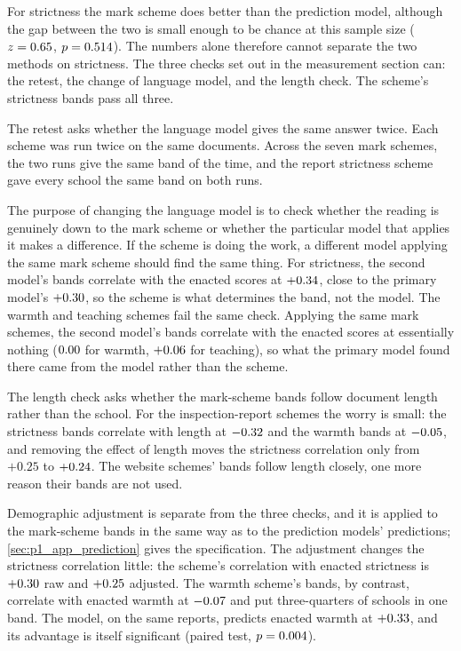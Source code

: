 For strictness the mark scheme does better than the prediction model, although the gap between the two is small enough to
be chance
at this sample size ($z = 0.65$, $p = 0.514$). The numbers alone therefore cannot
separate the two methods on strictness. The three checks set out in the measurement section
can: the retest, the change of language model, and the length check. The scheme's strictness bands pass all three.

The retest asks whether the language model gives the same answer twice. Each scheme was run
twice on the same documents. Across the seven mark schemes, the two runs give the same
band \GridRetestExact{} of the time, and the report strictness scheme gave every school
the same band on both runs.

The purpose of changing the language model is to check whether the reading is genuinely down
to the mark scheme or whether the particular model that applies it makes a difference.
If the scheme is doing the work, a different model applying the same mark scheme should find the same thing. For strictness, the second model's bands correlate with the enacted scores at $+0.34$, close to the primary model's $+0.30$, so the
scheme is what determines the band, not the model. The warmth and teaching schemes fail
the same check. Applying the same mark schemes, the second model's bands correlate with the enacted scores at essentially nothing ($0.00$ for warmth, $+0.06$ for teaching), so what the
primary model found there came from the model rather than the scheme.

The length check asks whether the mark-scheme bands follow document length rather than the school. For the inspection-report schemes the worry is small: the strictness bands correlate with length at $-0.32$ and the warmth bands at $-0.05$, and removing the effect of length moves the strictness correlation only from $+0.25$ to $+0.24$. The website schemes' bands follow length closely, one more reason their bands are not used.

Demographic adjustment is separate from the three checks, and it is applied to the mark-scheme bands in the same way as to the prediction models' predictions; \cref{sec:p1_app_prediction} gives the specification. The adjustment changes the strictness correlation little: the scheme's correlation with enacted strictness is $+0.30$ raw and $+0.25$ adjusted. The warmth scheme's bands, by contrast, correlate with enacted warmth at $-0.07$ and put three-quarters of schools in one band. The model, on the same reports, predicts enacted warmth at $+0.33$,
and its advantage is itself significant (paired test, $p = 0.004$).


